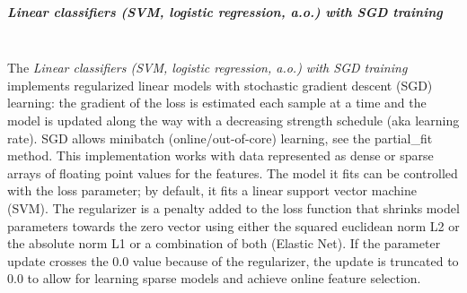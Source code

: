 \subparagraph{Linear classifiers (SVM, logistic regression, a.o.) with SGD
training}
\mbox{}
\\The \textit{Linear classifiers (SVM, logistic regression, a.o.) with SGD
  training} implements regularized linear models with stochastic gradient
descent (SGD) learning: the gradient of the loss is estimated each sample at a
time and the model is updated along the way with a decreasing strength schedule
(aka learning rate).
%
SGD allows minibatch (online/out-of-core) learning, see the
partial\_fit method.
%
This implementation works with data represented as dense or sparse arrays of
floating point values for the features.
%
The model it fits can be controlled with the loss parameter; by default, it fits
a linear support vector machine (SVM).
%
The regularizer is a penalty added to the loss function that shrinks model
parameters towards the zero vector using either the squared euclidean norm L2 or
the absolute norm L1 or a combination of both (Elastic Net).
%
If the parameter update crosses the 0.0 value because of the regularizer, the
update is truncated to 0.0 to allow for learning sparse models and achieve
online feature selection.
%
